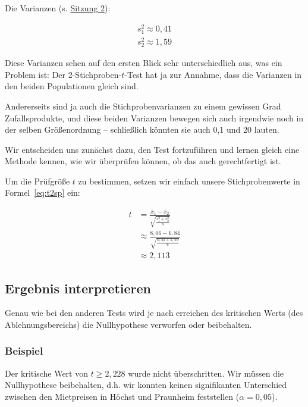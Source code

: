 \documentclass[
  11pt,
  ngerman,
  a4paper,
]{report}
\begin{document}
Die Varianzen (s. \protect\hyperlink{varianz}{Sitzung 2}):

\[\begin{aligned}
s^2_1\approx0{,}41\\[4pt]
s^2_2\approx1{,}59
\end{aligned}\]

Diese Varianzen sehen auf den ersten Blick sehr unterschiedlich aus, was ein Problem ist: Der 2-Stichproben-\(t\)-Test hat ja zur Annahme, dass die Varianzen in den beiden Populationen gleich sind.

Andererseits sind ja auch die Stichprobenvarianzen zu einem gewissen Grad Zufallsprodukte, und diese beiden Varianzen bewegen sich auch irgendwie noch in der selben Größenordnung -- schließlich könnten sie auch 0,1 und 20 lauten.

Wir entscheiden uns zunächst dazu, den Test fortzuführen und lernen gleich eine Methode kennen, wie wir überprüfen können, ob das auch gerechtfertigt ist.

Um die Prüfgröße \(t\) zu bestimmen, setzen wir einfach unsere Stichprobenwerte in Formel~\eqref{eq:t2sp} ein:

\[\begin{aligned}
t&=\frac{\bar{x}_1-\bar{x}_2}{\sqrt{\frac{s^2_1+s^2_2}{n}}}\\[6pt]
&\approx\frac{8{,}06-6{,}84}{\sqrt{\frac{0{,}41+1{,}59}{6}}}\\[4pt]
&\approx2{,}113
\end{aligned}\]

\hypertarget{ergebnis-interpretieren-1}{%
\subsection{Ergebnis interpretieren}\label{ergebnis-interpretieren-1}}

Genau wie bei den anderen Tests wird je nach erreichen des kritischen Werts (des Ablehnungsbereichs) die Nullhypothese verworfen oder beibehalten.

\hypertarget{beispiel-16}{%
\subsubsection{Beispiel}\label{beispiel-16}}

Der kritische Wert von \(t \geq 2{,}228\) wurde nicht überschritten. Wir müssen die Nullhypothese beibehalten, d.h. wir konnten keinen signifikanten Unterschied zwischen den Mietpreisen in Höchst und Praunheim feststellen (\(\alpha=0{,}05\)).
\end{document}
